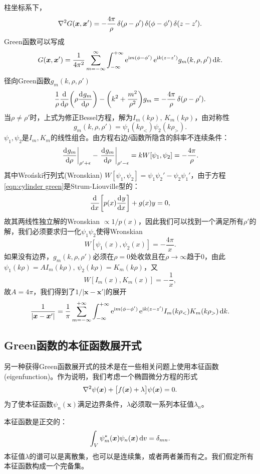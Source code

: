 柱坐标系下，
\[
    \nabla^2 G(\bm x,\bm x')=-\frac{4\pi}\rho\mathop{}\!\delta(\rho-\rho')\mathop{}\!\delta(\phi-\phi')\mathop{}\!\delta(z-z').
\]
Green函数可以写成
\[
    G(\bm x,\bm x')=\frac1{4\pi^2}\sum_{m=-\infty}^\infty\int_{-\infty}^{+\infty}\mathop{}\!\mathrm{e}^{\mathrm{i} m(\phi-\phi')}\mathop{}\!\mathrm{e}^{\mathrm{i} k(z-z')}g_m(k,\rho,\rho')\mathop{}\!\mathrm{d} k.
\]
径向Green函数$g_m(k,\rho,\rho')$
\begin{equation}
    \label{eqn:cylinder green}
    \frac1\rho\frac{\mathrm{d}^{{}}}{\mathrm{d}{\rho}^{{}}}\biggl(\rho\frac{\mathrm{d}^{{}}g_m}{\mathrm{d}{\rho}^{{}}}\biggr)-\biggl(k^2+\frac{m^2}{\rho^2}\biggr)g_m=-\frac{4\pi}\rho\mathop{}\!\delta(\rho-\rho').
\end{equation}
当$\rho\neq\rho'$时，上式为修正Bessel方程，解为$I_m(k\rho),\,K_m(k\rho)$，由对称性
\[
    g_m(k,\rho,\rho')=\psi_1(k\rho_<)\psi_2(k\rho_>).
\]
$\psi_1,\psi_2$是$I_m,K_m$的线性组合。由方程右边$\delta$函数所隐含的斜率不连续条件：
\[
    \left.\frac{\mathrm{d}^{{}}g_m}{\mathrm{d}{\rho}^{{}}}\right\rvert_{\rho'+\epsilon}-\left.\frac{\mathrm{d}^{{}}g_m}{\mathrm{d}{\rho}^{{}}}\right\rvert_{\rho'-\epsilon}=kW[\psi_1,\psi_2]=-\frac{4\pi}\rho.
\]
其中Wro\'nski行列式(Wronskian) $W[\psi_1,\psi_2]=\psi_1\psi_2'-\psi_2\psi_1'$，由于方程\eqref{eqn:cylinder green}是Strum-Liouville型的：
\[
    \frac{\mathrm{d}^{{}}}{\mathrm{d}{x}^{{}}}\biggl[p(x)\frac{\mathrm{d}^{{}}y}{\mathrm{d}{x}^{{}}}\biggr]+g(x)y=0,
\]
故其两线性独立解的Wronskian $\propto 1/p(x)$，因此我们可以找到一个满足所有$\rho'$的解，我们必须要求归一化$\psi_1\psi_2$使得Wronskian
\[
    W[\psi_1(x),\psi_2(x)]=-\frac{4\pi}x.
\]
如果没有边界，$g_m(k,\rho,\rho')$必须在$\rho=0$处收敛且在$\rho\to\infty$趋于0，由此$\psi_1(k\rho)=AI_m(k\rho),\,\psi_2(k\rho)=K_m(k\rho)$，又
\[
    W[I_m(x),K_m(x)]=-\frac1x,
\]
故$A=4\pi$，我们得到了$1/|\bm x-\bm x'|$的展开 
\begin{equation}
    \frac1{|\bm x-\bm x'|}=\frac1\pi\sum_{m=-\infty}^{+\infty}\int_{-\infty}^{+\infty}\mathop{}\!\mathrm{e}^{\mathrm{i} m(\phi-\phi')}\mathop{}\!\mathrm{e}^{\mathrm{i} k(z-z')}I_m(k\rho_<)K_m(k\rho_>)\mathop{}\!\mathrm{d} k.
\end{equation}

\subsection{Green函数的本征函数展开式}
\label{ssec:eigenfunction expansions for Green functions}

另一种获得Green函数展开式的技术是在一些相关问题上使用本征函数(eigenfunction)。作为说明，我们考虑一个椭圆微分方程的形式
\begin{equation}
    \nabla^2\psi(\bm x)+\bigl[f(\bm x)+\lambda\bigr]\psi(\bm x)=0.
\end{equation}
为了使本征函数$\psi_n(\bm x)$满足边界条件，$\lambda$必须取一系列本征值$\lambda_n$。

本征函数是正交的：
\[
    \int_V\psi_m^\ast(\bm x)\psi_n(\bm x)\mathop{}\!\mathrm{d} v=\mathop{}\!\delta_{mn}.
\]
本征值$\lambda$的谱可以是离散集，也可以是连续集，或者两者兼而有之。我们假定所有本征函数构成一个完备集。

